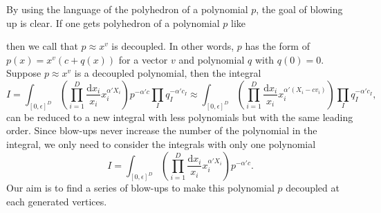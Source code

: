 \documentclass[12pt]{article}
\theoremstyle{definition}
\theoremstyle{plain}
\newcommand{\dif}{\mathrm{d}} %
\begin{document}

By using the language of the polyhedron of a polynomial $p$, the goal of blowing up is clear.
If one gets polyhedron of a polynomial $p$ like
\begin{center}
\end{center}
then we call that $p\approx x^v$ is decoupled. In other words, $p$ has the form of 
\(
p(x)=x^v(c+q(x))
\) for a vector $v$ and polynomial $q$ with $q(0)=0$. 
Suppose $p\approx x^v$ is a decoupled polynomial, then
the integral
\[
	I=\int_{[0,\epsilon]^D} \left(\prod_{i=1}^D\frac{\dif x_i}{x_i}x_i^{\alpha' X_i}\right)
	p^{-\alpha' c} \prod_I q_I^{-\alpha' c_I}
	\approx\int_{[0,\epsilon]^D} \left(\prod_{i=1}^D\frac{\dif x_i}{x_i}x_i^{\alpha' (X_i-cv_i)}\right)
	\prod_I q_I^{-\alpha' c_I},
\] 
can be reduced to a new integral with less polynomials but with the same leading order. 
Since blow-ups never increase the 
number of the polynomial in the integral, we only need to consider the integrals with only one 
polynomial
\[
	I=\int_{[0,\epsilon]^D} \left(\prod_{i=1}^D\frac{\dif x_i}{x_i}x_i^{\alpha' X_i}\right)
	p^{-\alpha' c}.
\] 
Our aim is to find a series of blow-ups to make this polynomial $p$ decoupled at
each generated vertices.
\end{document}
